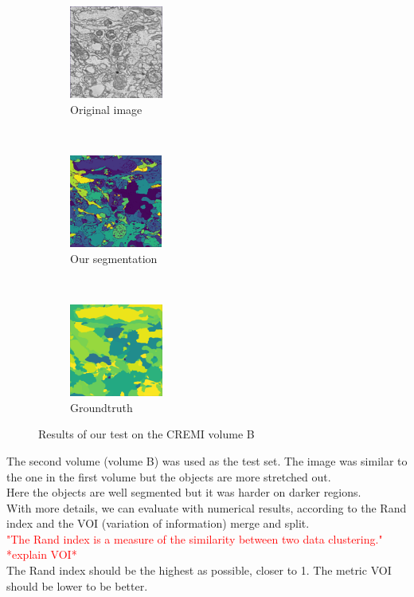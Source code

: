 \begin{figure}[!htbp]
    \centering
    \begin{subfigure}[t]{0.31\textwidth}
        \centering
        \includegraphics[height=1.2in]{./images/cremi_orig_2.png}
        \caption{Original image}
    \end{subfigure}%
    ~ 
    \begin{subfigure}[t]{0.31\textwidth}
        \centering
        \includegraphics[height=1.2in]{./images/cremi_out_2.png}
        \caption{Our segmentation}
    \end{subfigure}
    ~ 
    \begin{subfigure}[t]{0.31\textwidth}
        \centering
        \includegraphics[height=1.2in]{./images/cremi_gt_2.png}
        \caption{Groundtruth}
    \end{subfigure}
    \caption{Results of our test on the CREMI volume B}
\end{figure}

The second volume (volume B) was used as the test set.
The image was similar to the one in the first volume but the objects are more stretched out.\\
Here the objects are well segmented but it was harder on darker regions.\\

With more details, we can evaluate with numerical results, according to the Rand index and the VOI (variation of information) merge and split.\\ 
\textcolor{red}{"The Rand index is a measure of the similarity between two data clustering."
*explain VOI*\\}
The Rand index should be the highest as possible, closer to 1. 
The metric VOI should be lower to be better.\\

